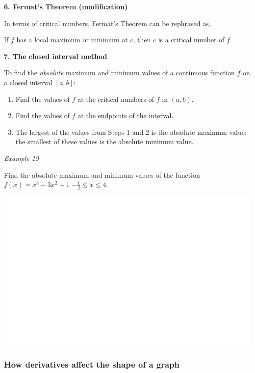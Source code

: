 \documentclass[]{book}
\begin{document}
\textbf{6. Fermat's Theorem (modification)}

In terms of critical numbers, Fermat's Theorem can be rephrased as,

If \(f\) has a local maximum or minimum at \(c\), then \(c\) is a critical number of \(f\).

\textbf{7. The closed interval method}

To find the \emph{absolute} maximum and minimum values of a continuous function \(f\) on a closed interval \([a,b]\):

\begin{enumerate}
\def\labelenumi{\arabic{enumi}.}
\item
  Find the values of \(f\) at the critical numbers of \(f\) in \((a,b)\).
\item
  Find the values of \(f\) at the endpoints of the interval.
\item
  The largest of the values from Steps 1 and 2 is the absolute maximum value; the smallest of these values is the absolute minimum value.
\end{enumerate}

\emph{Example 19}

Find the absolute maximum and minimum values of the function \(f(x)=x^3-3x^2+1\) \(-\frac{1}{2} \leq x \leq4.\)

\begin{center}\includegraphics[width=1\linewidth]{figure/LB34-1} \end{center}

\hypertarget{how-derivatives-affect-the-shape-of-a-graph}{%
\subsubsection{How derivatives affect the shape of a graph}\label{how-derivatives-affect-the-shape-of-a-graph}}
\end{document}
